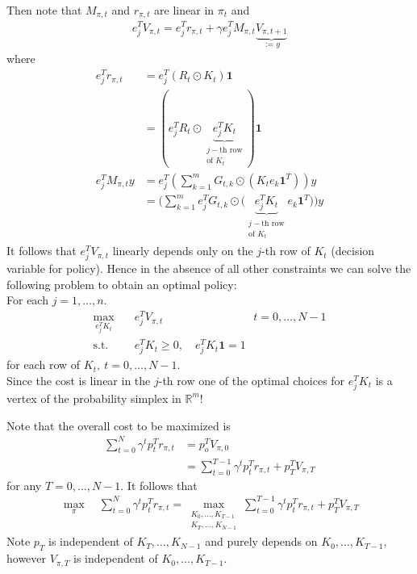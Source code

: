 \documentclass[]{article}
\newcommand{\mbf}{\mathbf}
\newcommand{\mb}{\mathbb}
\begin{document}
Then note that $M_{\pi,t}$ and $r_{\pi,t}$ are linear in $\pi_t$ and 
\begin{align}
e_j^T V_{\pi,t} = e_j^T r_{\pi,t} + \gamma e_j^T M_{\pi,t}\underbrace{V_{\pi,t+1}}_{:=y}
\end{align}
where
\begin{align}
e_j^Tr_{\pi,t}
& = e_j^T(R_t \odot K_t) \mbf{1} \\
& = (e_j^T R_t \odot
\underbrace{e_j^T K_t}_{\substack{j-\text{th row} \\ \text{of $K_t$}}}
) \mbf{1} \\
e_j^TM_{\pi,t} y & = e_j^T \left(\sum_{k=1}^m G_{t,k} \odot \left(K_t e_k \mbf{1}^T\right) \right)y \\
& = \Bigg( \sum_{k=1}^m e_j^T G_{t,k} \odot \Big(
\underbrace{e_j^T K_t}_{\substack{j-\text{th row} \\ \text{of $K_t$}}}
e_k \mbf{1}^T \Big) \Bigg) y
\end{align}
It follows that $e_j^T V_{\pi,t}$ linearly depends only on the $j$-th row of $K_t$ (decision variable for policy).  Hence in the absence of all other constraints we can solve the following problem to obtain an optimal policy:  \\
For each $j=1,\dots,n$. 
\begin{align}
\max_{e_j^T K_t}  & \quad e_j^T V_{\pi,t} \qquad \qquad \qquad \qquad t = 0,\dots,N-1 \\
\text{s.t.} & \quad e_j^T K_t \geq 0, \quad e_j^T K_t \mbf{1} = 1 
\end{align}
for each row of $K_t, \ t = 0,\dots,N-1$. \\
Since the cost is linear in the $j$-th row one of the optimal choices for $e_j^TK_t$ is a vertex of the probability simplex in $\mb{R}^m$!

Note that the overall cost to be maximized is
\begin{align}
\sum_{t=0}^N \gamma^t p_t^T r_{\pi,t}
& = p_o^T V_{\pi,0} \\
& = \sum_{t=0}^{T-1} \gamma^t p_t^T r_{\pi,t} + p_T^T V_{\pi,T}
\end{align}
for any $T = 0,...,N-1$.   It follows that 
\begin{align}
\max_{\pi}  \quad \sum_{t=0}^N \gamma^t p_t^T r_{\pi,t} 
 = \max_{\substack{K_0,\dots,K_{T-1} \\ K_T,\dots,K_{N-1}}} \sum_{t=0}^{T-1} \gamma^t p_t^T r_{\pi,t} + p_T^T V_{\pi,T}
\end{align}
Note $p_T$ is independent of $K_T,\dots,K_{N-1}$ and purely depends on $K_0,\dots,K_{T-1}$, however $V_{\pi,T}$ is independent of $K_0,\dots,K_{T-1}$.
\end{document}
